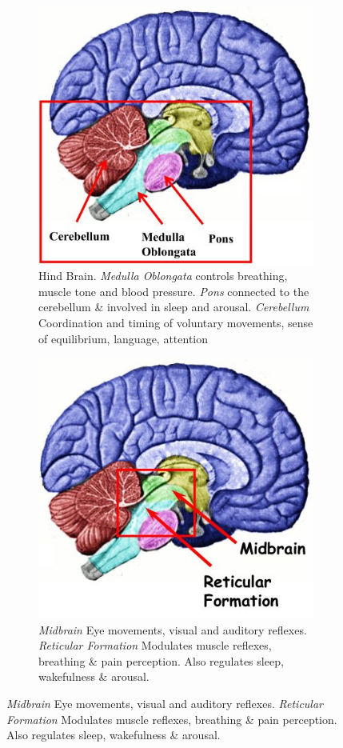 \documentclass[]{article}
\begin{document}
\begin{figure}[H]
	\caption{Brain Regions}
	\begin{subfigure}[b]{0.45\textwidth}
		\caption{Hind Brain. \emph{Medulla Oblongata} controls breathing, muscle tone and blood pressure.
			\emph{Pons} connected to the cerebellum \& involved in sleep and arousal.
			\emph{Cerebellum} Coordination and timing of voluntary movements, sense of equilibrium, language, attention}
		\includegraphics[width=\textwidth]{hindbrain}
	\end{subfigure}
	\begin{subfigure}[b]{0.45\textwidth}
		\caption{\emph{Midbrain} Eye movements, visual and auditory reflexes.
			\emph{Reticular Formation} 	Modulates muscle reflexes, breathing \& pain perception. Also regulates sleep, 			wakefulness \& 	arousal.}
		\includegraphics[width=\textwidth]{midbrain}

\end{subfigure}
\end{figure}
\end{document}
